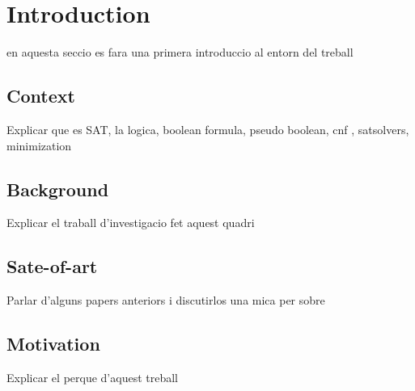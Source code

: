 \chapter{Introduction} %

\label{Chapter1} %

en aquesta seccio es fara una primera introduccio al entorn del treball

\section{Context}

Explicar que es SAT, la logica, boolean formula, pseudo boolean, cnf , satsolvers, minimization

\section{Background}

Explicar el traball d'investigacio fet aquest quadri

\section{Sate-of-art}

Parlar d'alguns papers anteriors i discutirlos una mica per sobre

\section{Motivation}

Explicar el perque d'aquest treball